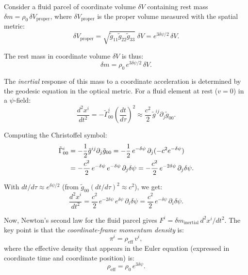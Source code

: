 \documentclass[12pt,twocolumn]{article}
\newcommand{\Reff}{\mathrm{eff}}
\newcommand{\dpsi}{\delta\psi}
\begin{document}
Consider a fluid parcel of coordinate volume $\delta V$ containing rest mass
$\delta m = \rho_0\,\delta V_\mathrm{proper}$, where $\delta V_\mathrm{proper}$
is the proper volume measured with the spatial metric:
\begin{equation}
\delta V_\mathrm{proper} = \sqrt{\tilde{g}_{11}\tilde{g}_{22}\tilde{g}_{33}}
\;\delta V = e^{3\dpsi/2}\,\delta V.
\label{eq:proper_volume}
\end{equation}

The rest mass in coordinate volume $\delta V$ is thus:
\begin{equation}
\delta m = \rho_0\,e^{3\dpsi/2}\,\delta V.
\label{eq:mass_in_coord}
\end{equation}

The \emph{inertial} response of this mass to a coordinate acceleration is
determined by the geodesic equation in the optical metric. For a fluid
element at rest ($v = 0$) in a $\psi$-field:
\begin{equation}
\frac{d^2 x^i}{dt^2} = -\tilde{\Gamma}^i_{00}\left(\frac{dt}{d\tau}\right)^2
\approx \frac{c^2}{2}\,\tilde{g}^{ij}\partial_j \tilde{g}_{00}.
\end{equation}

Computing the Christoffel symbol:
\begin{align}
\tilde{\Gamma}^i_{00} &= -\frac{1}{2}\tilde{g}^{ij}\partial_j\tilde{g}_{00}
= -\frac{1}{2}\,e^{-\dpsi}\,\partial_j(-c^2 e^{-\dpsi}) \notag\\
&= -\frac{c^2}{2}\,e^{-\dpsi}\,e^{-\dpsi}\,\partial_j\dpsi
= -\frac{c^2}{2}\,e^{-2\dpsi}\,\partial_j\dpsi.
\end{align}

With $dt/d\tau \approx e^{\dpsi/2}$ (from $\tilde{g}_{00}(dt/d\tau)^2
\approx c^2$), we get:
\begin{equation}
\frac{d^2 x^i}{dt^2} = \frac{c^2}{2}\,e^{-2\dpsi}\,e^{\dpsi}\,\partial_i\dpsi
= \frac{c^2}{2}\,e^{-\dpsi}\,\partial_i\dpsi.
\end{equation}

Now, Newton's second law for the fluid parcel gives $F^i = \delta m_\mathrm{inertial}\,d^2x^i/dt^2$. The key point is that the \emph{coordinate-frame momentum density} is:
\begin{equation}
\pi^i = \rho_\Reff\,v^i,
\end{equation}
where the effective density that appears in the Euler equation (expressed in
coordinate time and coordinate position) is:
\begin{equation}
\boxed{\rho_\Reff = \rho_0\,e^{3\dpsi}.}
\label{eq:rho_eff_final}
\end{equation}
\end{document}
